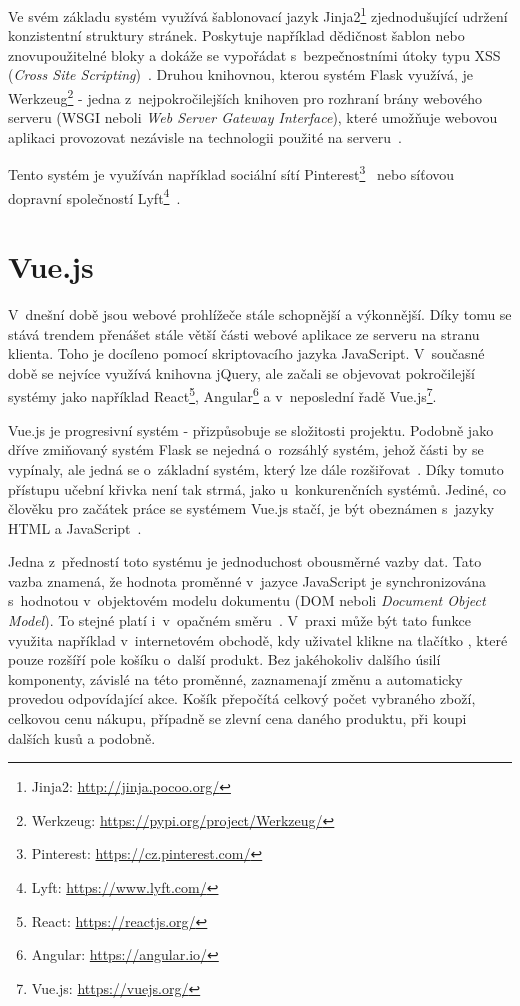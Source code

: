 Ve svém základu systém využívá šablonovací jazyk Jinja2\footnote{Jinja2: \url{http://jinja.pocoo.org/}} zjednodušující udržení konzistentní struktury stránek. Poskytuje například dědičnost šablon nebo znovupoužitelné bloky a dokáže se vypořádat s~bezpečnostními útoky typu XSS (\emph{Cross Site Scripting})~\cite{bib:jinja}.
Druhou knihovnou, kterou systém Flask využívá, je Werkzeug\footnote{Werkzeug: \url{https://pypi.org/project/Werkzeug/}} - jedna z~nejpokročilejších knihoven pro rozhraní brány webového serveru (WSGI neboli \emph{Web Server Gateway Interface}), které umožňuje webovou aplikaci provozovat nezávisle na technologii použité na serveru~\cite{bib:flask-pep}.

Tento systém je využíván například sociální sítí Pinterest\footnote{Pinterest: \url{https://cz.pinterest.com/}}~\cite{bib:flask-pinterest}
nebo síťovou dopravní společností Lyft\footnote{Lyft: \url{https://www.lyft.com/}}~\cite{bib:flask-lyft}.



\section{Vue.js}\label{section:Vue.js}
V~dnešní době jsou webové prohlížeče stále schopnější a výkonnější. Díky tomu se stává trendem přenášet stále větší části webové aplikace ze serveru na stranu klienta. Toho je docíleno pomocí skriptovacího jazyka JavaScript. V~současné době se nejvíce využívá knihovna jQuery, %
ale začali se objevovat pokročilejší systémy jako například React\footnote{React: \url{https://reactjs.org/}}, Angular\footnote{Angular: \url{https://angular.io/}} a v~neposlední řadě Vue.js\footnote{Vue.js: \url{https://vuejs.org/}}.

Vue.js je progresivní systém - přizpůsobuje se složitosti projektu. Podobně jako dříve zmiňovaný systém Flask se nejedná o~rozsáhlý systém, jehož části by se vypínaly, ale jedná se o~základní systém, který lze dále rozšiřovat~\cite{bib:vue-progressive}.
Díky tomuto přístupu učební křivka není tak strmá, jako u~konkurenčních systémů. Jediné, co člověku pro začátek práce se systémem Vue.js stačí, je být obeznámen s~jazyky HTML a JavaScript~\cite{bib:vue-curve}.

Jedna z~předností toto systému je jednoduchost obousměrné vazby dat. Tato vazba znamená, že hodnota proměnné v~jazyce JavaScript je synchronizována s~hodnotou v~objektovém modelu dokumentu (DOM neboli \emph{Document Object Model}). To stejné platí i~v~opačném směru~\cite{bib:vue-binding}.
V~praxi může být tato funkce využita například v~internetovém obchodě, kdy uživatel klikne na tlačítko , které pouze rozšíří pole košíku o~další produkt. Bez jakéhokoliv dalšího úsilí komponenty, závislé na této proměnné, zaznamenají změnu a automaticky provedou odpovídající akce. Košík přepočítá celkový počet vybraného zboží, celkovou cenu nákupu, případně se zlevní cena daného produktu, při koupi dalších kusů a podobně.



